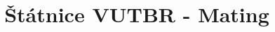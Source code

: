 \documentclass[a4]{report}
\theoremstyle{definition}
\begin{document}
\title{Štátnice VUTBR - Mating}
\maketitle

\tableofcontents











\end{document}
